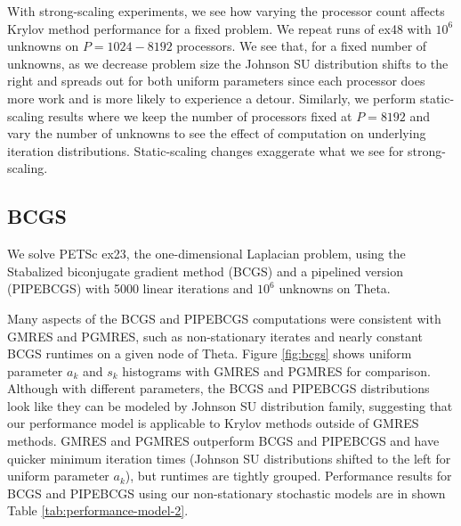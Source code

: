 \documentclass[num-refs]{wiley-article}
\begin{document}
With strong-scaling experiments, we see how varying the processor count affects Krylov method performance for a fixed problem. We repeat runs of ex48 with  $10^6$ unknowns on $P = 1024 - 8192$ processors. 
We see that, for a fixed number of unknowns, as we decrease problem size the Johnson SU distribution shifts to the right and spreads out for both uniform parameters since each processor does more work and is more likely to experience a detour. 
Similarly, we perform static-scaling results where we keep the number of processors fixed at $P=8192$ and vary the number of unknowns to see the effect of computation on underlying iteration distributions.
Static-scaling changes exaggerate what we see for strong-scaling.


\subsection{BCGS}\label{sec:bcgs}

We solve PETSc ex23, the one-dimensional Laplacian problem, using the Stabalized biconjugate gradient method (BCGS) and a pipelined version (PIPEBCGS) with 5000 linear iterations and $10^6$ unknowns on Theta.  

Many aspects of the BCGS and PIPEBCGS computations were consistent with GMRES and PGMRES, such as non-stationary iterates and nearly constant BCGS runtimes on a given node of Theta. 
Figure \ref{fig:bcgs} shows uniform parameter $a_k$ and $s_k$ histograms with GMRES and PGMRES for comparison. 
Although with different parameters, the BCGS and PIPEBCGS distributions look like they can be modeled by Johnson SU distribution family, 
suggesting that our performance model is applicable to Krylov methods outside of GMRES methods.
GMRES and PGMRES outperform BCGS and PIPEBCGS and have quicker minimum iteration times (Johnson SU distributions shifted to the left for uniform parameter $a_k$), but runtimes are  tightly grouped.
Performance results for BCGS and PIPEBCGS using our non-stationary stochastic models are in shown Table \ref{tab:performance-model-2}.
\end{document}
